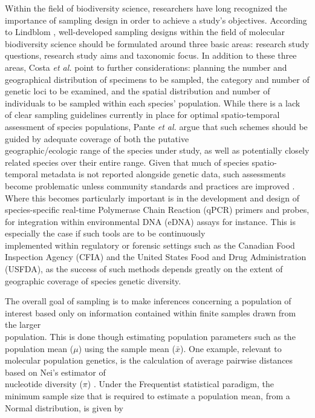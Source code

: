Within the field of biodiversity science, researchers have long recognized the \\ importance of sampling design in order to achieve a study's objectives. According to Lindblom \cite{lindblom2009sample}, well-developed sampling designs within the field of molecular \\ biodiversity science should be formulated around three basic areas: research study \\ questions, research study aims and taxonomic focus. In addition to these three areas,  Costa \textit{et al.} \cite{costa2015conservation} point to further considerations: planning the number and geographical distribution of specimens to be sampled, the category and number of genetic loci to be examined, and the spatial distribution and number of individuals to be sampled within each species' population. While there is a lack of clear sampling guidelines currently in place for optimal spatio-temporal assessment of species populations, Pante \textit{et al.} \cite{pante2015species} argue that such schemes should be guided by adequate coverage of both the putative \\ geographic/ecologic range of the species under study, as well as potentially closely related species over their entire range. Given that much of species spatio-temporal metadata is not reported alongside genetic data, such assessments become problematic unless community standards and practices are improved \cite{hanner2009data, naaum2015standards, strohm2016mitogenome}. Where this becomes particularly important is in the development and design of species-specific real-time Polymerase Chain Reaction (qPCR) primers and probes, for integration within environmental DNA (eDNA) assays for instance. This is especially the case if such tools are to be continuously \\ implemented within regulatory or forensic settings such as the Canadian Food Inspection Agency (CFIA) \cite{Shehata2018dna} and the United States Food and Drug Administration (USFDA), as the success of such methods depends greatly on the extent of geographic coverage of species genetic diversity.

 

The overall goal of sampling is to make inferences concerning a population of interest based only on information contained within finite samples drawn from the larger \\ population. This is done though estimating population parameters such as the population mean ($\mu$) using the sample mean ($\bar{x}$). One example, relevant to molecular population genetics, is the calculation of average pairwise distances based on Nei's estimator of \\ nucleotide diversity ($\pi$) \cite{nei1979mathematical}. Under the Frequentist statistical paradigm, the minimum sample size that is required to estimate a population mean, from a Normal distribution, is given by \cite{adcock1997sample}

